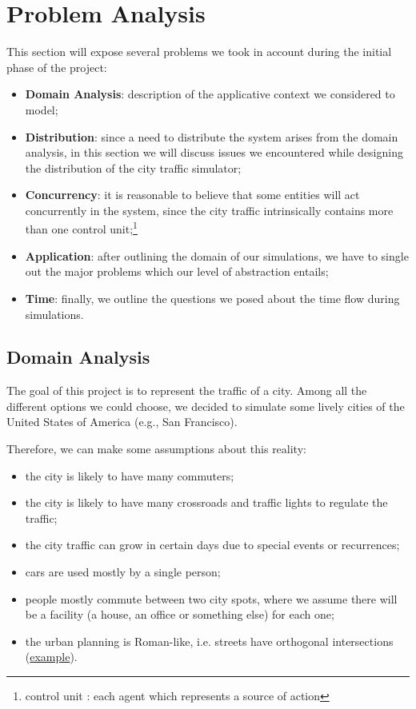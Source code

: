 \section{Problem Analysis}

This section will expose several problems we took in account during the
initial phase of the project:

\begin{itemize}
\item \textbf{Domain Analysis}: description of the applicative context we
  considered to model;
\item \textbf{Distribution}: since a need to distribute the system arises from
  the domain analysis, in this section we will discuss issues we encountered
  while designing the distribution of the city traffic simulator;
\item \textbf{Concurrency}: it is reasonable to believe that some entities
  will act concurrently in the system, since the city traffic intrinsically
  contains more than one control unit;\footnote{control unit : each
  agent which represents a source of action}
\item \textbf{Application}: after outlining the domain of our simulations, we
  have to single out the major problems which our level of abstraction entails;
\item \textbf{Time}: finally, we outline the questions we posed
about the time flow during simulations.
\end{itemize}


\subsection{Domain Analysis}\label{sec:pa-domain}
The goal of this project is to represent the traffic of a city. Among all the
different options we could choose, we decided to simulate some lively cities of
the United States of America (e.g., San Francisco).

Therefore, we can make some assumptions about this reality:

\begin{itemize}
\item the city is likely to have many commuters;
\item the city is likely to have many crossroads and traffic lights to
  regulate the traffic;
\item the city traffic can grow in certain days due to special events or
  recurrences;
\item cars are used mostly by a single person;
\item people mostly commute between two city spots, where we assume there
  will be a facility (a house, an office or something else) for each one;
\item the urban planning is Roman-like, i.e. streets have orthogonal
  intersections (\href{https://www.google.it/maps/place/San+Francisco,+California,+Stati+Uniti/@37.7766566,-122.4330836,16z/data=!4m2!3m1!1s0x80859a6d00690021:0x4a501367f076adff}{example}).
\end{itemize}

